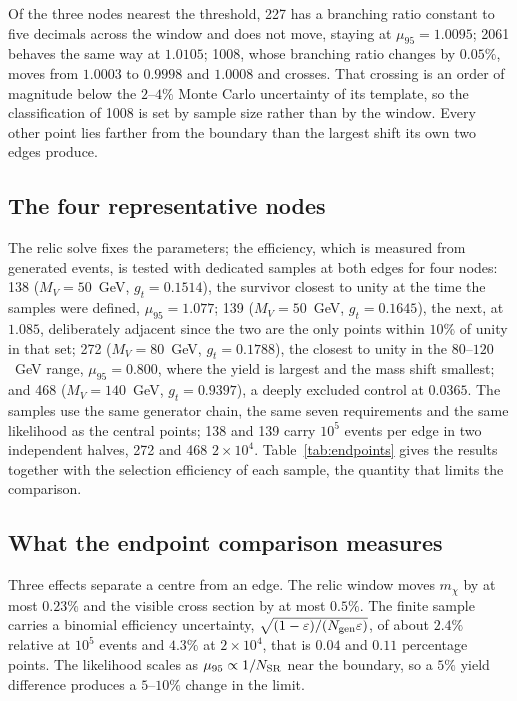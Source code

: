 Of the three nodes nearest the threshold, 227 has a branching ratio constant to five decimals across the window and does not move, staying at $\mu_{95}=1.0095$; 2061 behaves the same way at $1.0105$; 1008, whose branching ratio changes by $0.05\%$, moves from $1.0003$ to $0.9998$ and $1.0008$ and crosses. That crossing is an order of magnitude below the $2$--$4\%$ Monte Carlo uncertainty of its template, so the classification of 1008 is set by sample size rather than by the window. Every other point lies farther from the boundary than the largest shift its own two edges produce.

\subsection{The four representative nodes}\label{sec:endpoints}

The relic solve fixes the parameters; the efficiency, which is measured from generated events, is tested with dedicated samples at both edges for four nodes: 138 ($M_V=50$~GeV, $g_t=0.1514$), the survivor closest to unity at the time the samples were defined, $\mu_{95}=1.077$; 139 ($M_V=50$~GeV, $g_t=0.1645$), the next, at $1.085$, deliberately adjacent since the two are the only points within $10\%$ of unity in that set; 272 ($M_V=80$~GeV, $g_t=0.1788$), the closest to unity in the $80$--$120$~GeV range, $\mu_{95}=0.800$, where the yield is largest and the mass shift smallest; and 468 ($M_V=140$~GeV, $g_t=0.9397$), a deeply excluded control at $0.0365$. The samples use the same generator chain, the same seven requirements and the same likelihood as the central points; 138 and 139 carry $10^5$ events per edge in two independent halves, 272 and 468 $2\times10^4$. Table~\ref{tab:endpoints} gives the results together with the selection efficiency of each sample, the quantity that limits the comparison.

\subsection{What the endpoint comparison measures}

Three effects separate a centre from an edge. The relic window moves $m_\chi$ by at most $0.23\%$ and the visible cross section by at most $0.5\%$. The finite sample carries a binomial efficiency uncertainty, $\sqrt{(1-\varepsilon)/(N_{\rm gen}\varepsilon)}$, of about $2.4\%$ relative at $10^5$ events and $4.3\%$ at $2\times10^4$, that is $0.04$ and $0.11$ percentage points. The likelihood scales as $\mu_{95}\propto1/N_{\rm SR}$ near the boundary, so a $5\%$ yield difference produces a $5$--$10\%$ change in the limit.

